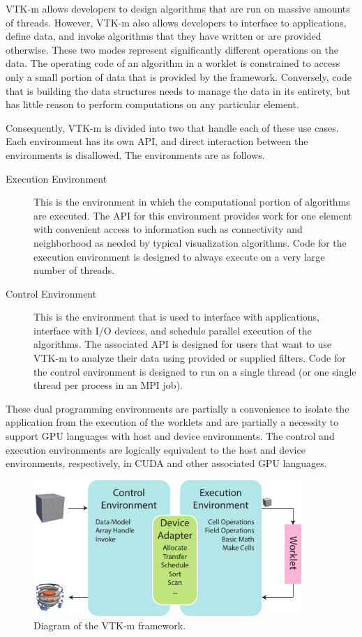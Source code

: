 VTK-m allows developers to design algorithms that are run on massive
amounts of threads. However, VTK-m also allows developers to interface to
applications, define data, and invoke algorithms that they have written or
are provided otherwise. These two modes represent significantly different
operations on the data. The operating code of an algorithm in a worklet is
constrained to access only a small portion of data that is provided by the
framework. Conversely, code that is building the data structures needs to
manage the data in its entirety, but has little reason to perform
computations on any particular element.

Consequently, VTK-m is divided into two 
 that handle each of these use cases. Each environment
has its own API, and direct interaction between the environments is
disallowed. The environments are as follows.

\begin{description}
\item[Execution Environment] 
   This is the environment in which the
  computational portion of algorithms are executed. The API for this
  environment provides work for one element with convenient access to
  information such as connectivity and neighborhood as needed by typical
  visualization algorithms. Code for the execution environment is designed
  to always execute on a very large number of threads.
\item[Control Environment] 
   This is the environment that is used to
  interface with applications, interface with I/O devices, and schedule
  parallel execution of the algorithms. The associated API is designed for
  users that want to use VTK-m to analyze their data using provided or
  supplied filters. Code for the control environment is designed to run on
  a single thread (or one single thread per process in an MPI job).
\end{description}

These dual programming environments are partially a convenience to isolate
the application from the execution of the worklets and are partially a
necessity to support GPU languages with host and device environments. The
control and execution environments are logically equivalent to the host and
device environments, respectively, in CUDA and other associated GPU
languages.

\begin{figure}[htb]
  \centering
  \includegraphics[width=4in]{images/VTKmEnvironments}
  \caption{Diagram of the VTK-m framework.}
  \label{fig:VTKmDiagram}
\end{figure}

